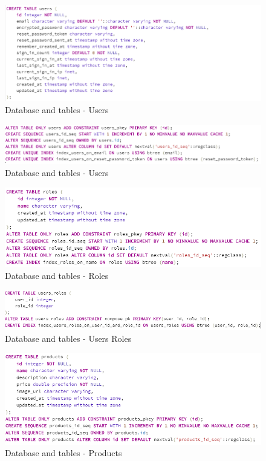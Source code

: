 \documentclass{article}
\begin{document}
\begin{figure}
\centering
\includegraphics[scale=0.8]{3}
\caption{Database and tables - Users}
\end{figure}
\begin{figure}
\centering
\includegraphics[scale=0.8]{3_1}
\caption{Database and tables - Users}
\end{figure}
\begin{figure}
\centering
\includegraphics[scale=0.8]{4}
\caption{Database and tables - Roles}
\end{figure}
\begin{figure}
\centering
\includegraphics[scale=0.8]{5}
\caption{Database and tables - Users Roles}
\end{figure}
\begin{figure}
\centering
\includegraphics[scale=0.8]{6}
\caption{Database and tables - Products}
\end{figure}
\end{document}
